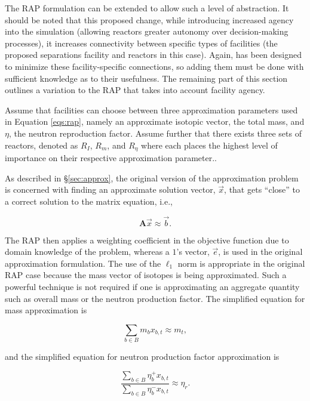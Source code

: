 The RAP formulation can be extended to allow such a level of abstraction. It
should be noted that this proposed change, while introducing increased agency
into the simulation (allowing reactors greater autonomy over decision-making
processes), it increases connectivity between specific types of facilities (the
proposed separations facility and reactors in this case). Again, \Cyclus has
been designed to minimize these facility-specific connections, so adding them
must be done with sufficient knowledge as to their usefulness. The remaining
part of this section outlines a variation to the RAP that takes into account
facility agency.

Assume that facilities can choose between three approximation parameters used in
Equation \ref{eqs:rap}, namely an approximate isotopic vector, the total mass,
and $\eta$, the neutron reproduction factor. Assume further that there exists
three sets of reactors, denoted as $R_I$, $R_m$, and $R_\eta$ where each places
the highest level of importance on their respective approximation parameter..

As described in \S\ref{sec:approx}, the original version of the approximation
problem is concerned with finding an approximate solution vector, $\vec{x}$,
that gets ``close'' to a correct solution to the matrix equation, i.e.,

\begin{equation*}
  \mathbf{A} \vec{x} \approx \vec{b}.
\end{equation*}

The RAP then applies a weighting coefficient in the objective function due to
domain knowledge of the problem, whereas a $1$'s vector, $\vec{e}$, is used in
the original approximation formulation. The use of the $\ell_1$ norm is
appropriate in the original RAP case because the mass vector of isotopes is
being approximated. Such a powerful technique is not required if one is
approximating an aggregate quantity such as overall mass or the neutron
production factor. The simplified equation for mass approximation is

\begin{equation*}
  \sum_{b \in B} m_{b} x_{b,t} \approx m_{t},
\end{equation*}

and the simplified equation for neutron production factor approximation is

\begin{equation*}
\frac{\sum_{b \in B} \eta_{b}^{+} x_{b,t}}
     {\sum_{b \in B} \eta_{b}^{-} x_{b,t}} 
\approx \eta_{r}.
\end{equation*}

